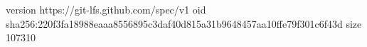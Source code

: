 version https://git-lfs.github.com/spec/v1
oid sha256:220f3fa18988eaaa8556895c3daf40d815a31b9648457aa10ffe79f301c6f43d
size 107310

